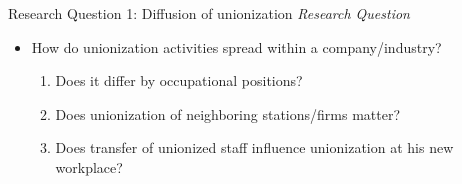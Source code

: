 \begin{frame}{Research Question 1: Diffusion of unionization}
\emph{Research Question}
\begin{itemize}
    \item How do unionization activities spread within a company/industry?
    \begin{enumerate}
            \item Does it differ by occupational positions?
            \item Does unionization of neighboring stations/firms matter?
            \item Does transfer of unionized staff influence unionization at his new workplace?
    \end{enumerate}

\end{itemize}
\end{frame}
